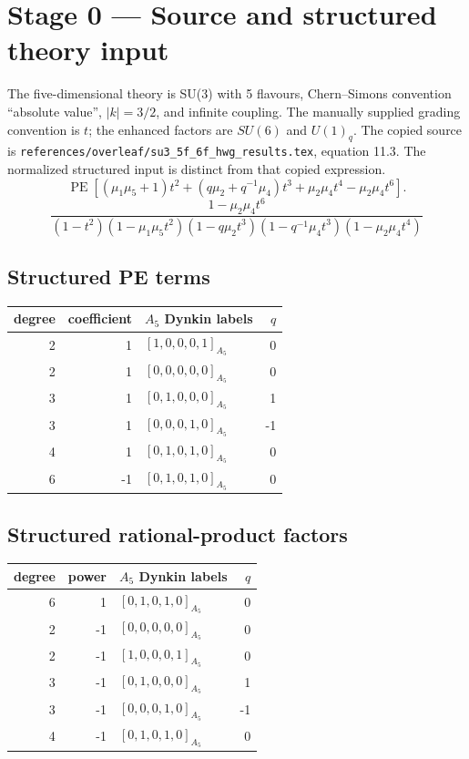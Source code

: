 \documentclass[11pt]{article}
\newcommand{\Dynkin}[1]{#1}
\newcommand{\RawPath}[1]{\texttt{#1}}
\begin{document}
\section{Stage 0 --- Source and structured theory input}
The five-dimensional theory is SU(3) with 5 flavours, Chern--Simons convention ``absolute value'', $|k|=3/2$, and infinite coupling.  The manually supplied grading convention is $t$; the enhanced factors are $SU(6)$ and $U(1)_q$.
The copied source is \RawPath{references/overleaf/su3\_5f\_6f\_hwg\_results.tex}, equation 11.3. The normalized structured input is distinct from that copied expression.
\[\operatorname{PE}[(\mu_1\mu_5+1)t^2+(q\mu_2+q^{-1}\mu_4)t^3+\mu_2\mu_4t^4-\mu_2\mu_4t^6].\]
\[\frac{1-\mu_2\mu_4t^6}
{(1-t^2)(1-\mu_1\mu_5t^2)(1-q\mu_2t^3)(1-q^{-1}\mu_4t^3)(1-\mu_2\mu_4t^4)}\]
\subsection{Structured PE terms}
\begin{longtable}{r r l r}\toprule degree & coefficient & $A_5$ Dynkin labels & $q$\\\midrule\endhead
2 & 1 & $\Dynkin{[1,0,0,0,1]_{A_5}}$ & 0\\
2 & 1 & $\Dynkin{[0,0,0,0,0]_{A_5}}$ & 0\\
3 & 1 & $\Dynkin{[0,1,0,0,0]_{A_5}}$ & 1\\
3 & 1 & $\Dynkin{[0,0,0,1,0]_{A_5}}$ & -1\\
4 & 1 & $\Dynkin{[0,1,0,1,0]_{A_5}}$ & 0\\
6 & -1 & $\Dynkin{[0,1,0,1,0]_{A_5}}$ & 0\\
\bottomrule\end{longtable}
\subsection{Structured rational-product factors}
\begin{longtable}{r r l r}\toprule degree & power & $A_5$ Dynkin labels & $q$\\\midrule\endhead
6 & 1 & $\Dynkin{[0,1,0,1,0]_{A_5}}$ & 0\\
2 & -1 & $\Dynkin{[0,0,0,0,0]_{A_5}}$ & 0\\
2 & -1 & $\Dynkin{[1,0,0,0,1]_{A_5}}$ & 0\\
3 & -1 & $\Dynkin{[0,1,0,0,0]_{A_5}}$ & 1\\
3 & -1 & $\Dynkin{[0,0,0,1,0]_{A_5}}$ & -1\\
4 & -1 & $\Dynkin{[0,1,0,1,0]_{A_5}}$ & 0\\
\bottomrule\end{longtable}
\end{document}
